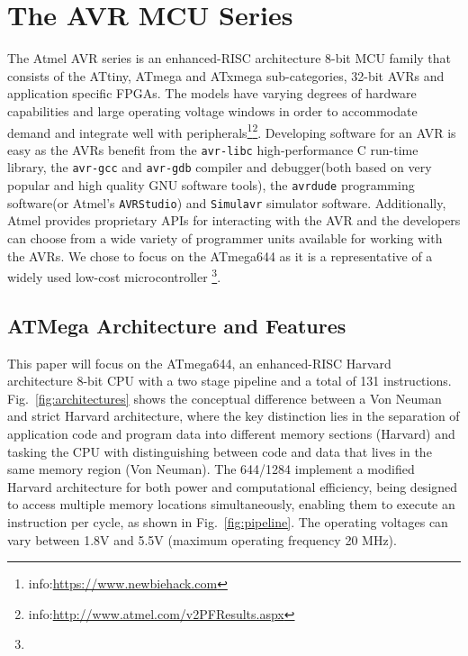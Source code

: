 \section{The AVR MCU Series}
\label{sec:atmega_overview}

	The Atmel AVR series is an enhanced-RISC architecture 8-bit MCU family that consists of the ATtiny, ATmega and ATxmega sub-categories,  32-bit AVRs and application specific FPGAs\cite{book:practical_avr}. The models have varying degrees of hardware capabilities and large operating voltage windows in order to accommodate demand and integrate well with peripherals\footnote{info:\href{https://www.newbiehack.com/MicrocontrollersAlternativePowerSources.aspx}{https://www.newbiehack.com}}\footnote{info:\href{http://www.atmel.com/v2PFResults.aspx}{http://www.atmel.com/v2PFResults.aspx}}. Developing software for an AVR is easy as the AVRs benefit from the  \texttt{avr-libc} high-performance C run-time library, the \texttt{avr-gcc} and \texttt{avr-gdb} compiler and debugger(both based on very popular and high quality GNU software tools), the \texttt{avrdude} programming software(or Atmel's \texttt{AVRStudio}) and \texttt{Simulavr} simulator software. Additionally, Atmel provides proprietary APIs for interacting with the AVR and the developers can choose from a wide variety of programmer units available for working with the AVRs\cite{book:practical_avr}. We chose to focus on the ATmega644 as it is a representative of a widely used low-cost microcontroller \citep{glitches_paper}\footnote{}.
	
	\subsection{ATMega Architecture and Features}				

	This paper will focus on the ATmega644, an enhanced-RISC Harvard architecture 8-bit CPU with a two stage pipeline and a total of 131 instructions. Fig.~\ref{fig:architectures} shows the conceptual difference between a Von Neuman and strict Harvard architecture, where the key distinction lies in the separation of application code and program data into different memory sections (Harvard) and tasking the CPU with distinguishing between code and data that lives in the same memory region (Von Neuman). The 644/1284 implement a modified  Harvard architecture for both power and computational efficiency, being designed to access multiple memory locations simultaneously, enabling them to execute an instruction per cycle, as shown in Fig.~\ref{fig:pipeline}. The operating voltages can vary between 1.8V and 5.5V (maximum operating frequency 20 MHz)\citep{atmega_manual}.

